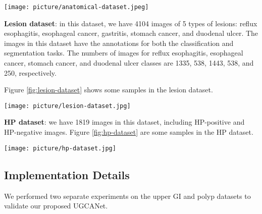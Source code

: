 \documentclass{article}
\begin{document}
\begin{figure*}[ht!]
\centerline{\texttt{[image: picture/anatomical-dataset.jpeg]}}
\caption{Some samples in anatomical dataset}
\label{fig:anatomical-dataset}
\end{figure*}

\textbf{Lesion dataset}: in this dataset, we have 4104 images of 5 types of lesions: reflux esophagitis, esophageal cancer, gastritis, stomach cancer, and duodenal ulcer. The images in this dataset have the annotations for both the classification and segmentation tasks. The numbers of images for reflux esophagitis, esophageal cancer, stomach cancer, and duodenal ulcer classes are 1335, 538, 1443, 538, and 250, respectively.

Figure \ref{fig:lesion-dataset} shows some samples in the lesion dataset.

\begin{figure*}[ht!]
\centerline{\texttt{[image: picture/lesion-dataset.jpg]}}
\caption{Some samples in lesion dataset}
\label{fig:lesion-dataset}
\end{figure*}

\textbf{HP dataset}: we have 1819 images in this dataset, including HP-positive and HP-negative images. Figure \ref{fig:hp-dataset} are some samples in the HP dataset.

\begin{figure*}[ht!]
\centerline{\texttt{[image: picture/hp-dataset.jpg]}}
\caption{Some samples in HP dataset}
\label{fig:hp-dataset}
\end{figure*}

\subsection{Implementation Details}

We performed two separate experiments on the upper GI and polyp datasets to validate our proposed UGCANet. 
\end{document}
